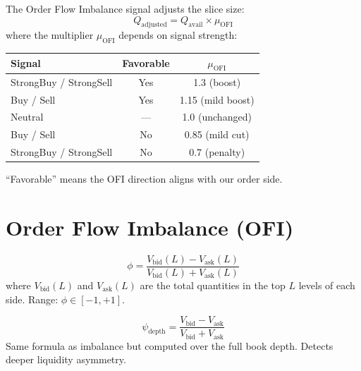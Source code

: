\documentclass[11pt,a4paper]{article}
\begin{document}
\begin{formulabox}[title={\S5.6 — OFI Size Multiplier}]
The Order Flow Imbalance signal adjusts the slice size:
\begin{equation}
  Q_{\text{adjusted}} = Q_{\text{avail}} \times \mu_{\text{OFI}}
\end{equation}
where the multiplier $\mu_{\text{OFI}}$ depends on signal strength:
\begin{center}
\begin{tabular}{lcc}
\toprule
\textbf{Signal} & \textbf{Favorable} & $\mu_{\text{OFI}}$ \\
\midrule
StrongBuy / StrongSell & Yes & 1.3 (boost) \\
Buy / Sell             & Yes & 1.15 (mild boost) \\
Neutral                & —   & 1.0 (unchanged) \\
Buy / Sell             & No  & 0.85 (mild cut) \\
StrongBuy / StrongSell & No  & 0.7 (penalty) \\
\bottomrule
\end{tabular}
\end{center}
``Favorable'' means the OFI direction aligns with our order side.
\end{formulabox}


\section{Order Flow Imbalance (OFI)}

\begin{formulabox}[title={\S6.1 — Volume Imbalance}]
\begin{equation}
  \phi = \frac{V_{\text{bid}}(L) - V_{\text{ask}}(L)}{V_{\text{bid}}(L) + V_{\text{ask}}(L)}
\end{equation}
where $V_{\text{bid}}(L)$ and $V_{\text{ask}}(L)$ are the total quantities in the top $L$ levels of each side. Range: $\phi \in [-1, +1]$.
\end{formulabox}

\begin{formulabox}[title={\S6.2 — Depth Skew}]
\begin{equation}
  \psi_{\text{depth}} = \frac{V_{\text{bid}} - V_{\text{ask}}}{V_{\text{bid}} + V_{\text{ask}}}
\end{equation}
Same formula as imbalance but computed over the full book depth. Detects deeper liquidity asymmetry.
\end{formulabox}
\end{document}

